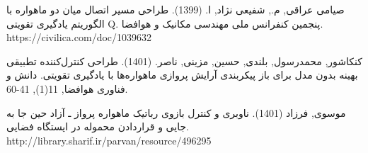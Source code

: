 \documentclass[a4paper]{article}
\newcommand{\Courses}[1]{
{
    \noindent
    \textbf{دروس مورد نیاز:}\\
    
    \centering
    \renewcommand{\arraystretch}{1.5}
    \begin{center}
    \begin{tabular}{| >{\centering}m{6em} | >{\centering}m{3em} | >{\centering}m{6em} | >{\centering}m{6em} | >{\centering}m{3em} | >{\centering\arraybackslash}m{6em} |}
         \hline
         \rowcolor{lightgray}
         \multicolumn{3}{|c|}{جبرانی}
         &
         \multicolumn{3}{|c|}{تخصصی
            \tiny
            (ارتباط موضوع پروژه با دروسی که دانشجو گذرانده یا باید بگذراند)
         }
         \\
         \hline
         \rowcolor{lightgray}
         گذرانده
         &
         نمره
         &
         باید بگذراند
         &
         گذرانده
         &
         نمره
         &
         باید بگذراند
         \\
         \hline
         &
         &
         &
         &
         &
         \\
         \hline
         &
         &
         &
         &
         &
         \\
         \hline
         &
         &
         &
         &
         &
         \\
         \hline
    \end{tabular}
    \end{center}
    \renewcommand{\arraystretch}{1}
}
}
\newcommand{\Signatures}{
{
    \renewcommand{\arraystretch}{1.5}
    
    \begin{center}
        \scriptsize
        \begin{tabular}{|m{15em}|m{15em}|m{15em}|}
            \hline
            استاد راهنما:
            &
            نظر گروه:
            &
            نظر کمیته تحصیلات تکمیلی دانشکده:
            \\
            تاریخ تحویل فرم به مدیر گروه:
            &
            &
            \\
            امضای استاد راهنما:
            &
            تاریخ جلسه گروه:
            &
            تاریخ جلسه کمیته:
            \\ 
            &
            امضای مدیر گروه:
            &
            امضای معاون تحصیلات تکمیلی:
            \\
            &
            &
            \\
            &
            &
            \\
            & &\\
            & &\\
            \hline
        \end{tabular}
    \end{center}
    \footnotesize
    توجه: فرم تعریف پروژه بایستی یک روز قبل از جلسه گروه توسط استاد راهنما تحویل مدیر گروه شود.
    \renewcommand{\arraystretch}{1}
}
}
\begin{document}
\begin{thebibliography}{1}
		صیامی عراقی, م.,  شفیعی نژاد, ا. (1399). طراحی مسیر اتصال میان دو ماهواره با الگوریتم یادگیری تقویتی Q. پنجمین کنفرانس ملی مهندسی مکانیک و هوافضا. https://civilica.com/doc/1039632
		
کنکاشور, محمدرسول, بلندی, حسین,  مزینی, ناصر. (1401). طراحی کنترل‌کننده تطبیقی بهینه بدون مدل برای باز پیکربندی آرایش پروازی ماهواره‌ها با یادگیری تقویتی. دانش و فناوری هوافضا, 11(1), 41-60.
		
		موسوی, فرزاد (1401). ناوبری و کنترل بازوی رباتیک ماهواره پرواز ـ آزاد حین جا به‌ جایی و قراردادن محموله در ایستگاه‌ فضایی. http://library.sharif.ir/parvan/resource/496295
		
	\end{thebibliography}



\end{document}
